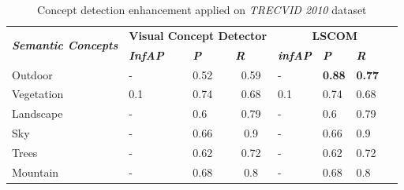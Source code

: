 		\begin{table}[h]
			\centering
			\caption{Concept detection enhancement applied on \textit{TRECVID 2010} dataset}
			\label{lscom2}
			\begin{tabular}{lp{1.2cm}p{1.2cm}p{1.2cm}p{1.2cm}p{1.2cm}p{1.2cm}}\hline
			\multicolumn{1}{c}{\multirow{2}{*}{\textit{\textbf{Semantic Concepts}}}} & \multicolumn{3}{c}{\textbf{Visual 				Concept Detector}}                                            & \multicolumn{3}{c}{\textbf								{LSCOM}}                                                                         \\ \cline{2-7} 
\multicolumn{1}{c}{}                                                     & \textit{\textbf{InfAP}}   & \textit{\textbf{P}}      & \multicolumn{1}{l|}{\textit{\textbf{R}}} & \textit{\textbf{infAP}}            & \textit{\textbf{P}}               & \textit{\textbf{R~~~~}}               \\ \hline
\multicolumn{1}{l|}{Outdoor}                                             & -                         & 0.52                     & \multicolumn{1}{c|}{0.59}                & -                                  & \textbf{0.88}                     & \textbf{0.77}                     \\
\multicolumn{1}{l|}{Vegetation}                                          & 0.1                       & 0.74                     & \multicolumn{1}{c|}{0.68}                & 0.1                                & 0.74                              & 0.68                              \\
\multicolumn{1}{l|}{Landscape}                                           & -                         & 0.6                      & \multicolumn{1}{c|}{0.79}                & -                                  & 0.6                               & 0.79                              \\
\multicolumn{1}{l|}{Sky}                                                 & -                         & 0.66                     & \multicolumn{1}{c|}{0.9}                 & -                                  & 0.66                              & 0.9                               \\
\multicolumn{1}{l|}{Trees}                                               & -                         & 0.62                     & \multicolumn{1}{c|}{0.72}                & -                                  & 0.62                              & 0.72                              \\
\multicolumn{1}{l|}{Mountain}                                            & -                         & 0.68                     & \multicolumn{1}{c|}{0.8}                 & -                                  & 0.68                              & 0.8                               \\

\end{tabular}
\end{table}
